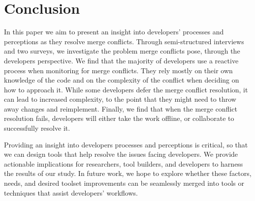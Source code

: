 \section{Conclusion}\label{conclusion}

In this paper we aim to present an insight into developers' processes and perceptions as they resolve merge conflicts.
Through semi-structured interviews and two surveys, we investigate the problem merge conflicts pose, through the developers perspective.
We find that the majority of developers use a reactive process when monitoring for merge conflicts.
They rely mostly on their own knowledge of the code and on the complexity of the conflict when deciding on how to approach it.
While some developers defer the merge conflict resolution, it can lead to increased complexity, to the point that they might need to throw away changes and reimplement.
Finally, we find that when the merge conflict resolution fails, developers will either take the work offline, or collaborate to successfully resolve it. 

Providing an insight into developers processes and perceptions is critical, so that we can design tools that help resolve the issues facing developers.
We provide actionable implications for researchers, tool builders, and developers to harness the results of our study.
In future work, we hope to explore whether these factors, needs, and desired toolset improvements can be seamlessly merged into tools or techniques that assist developers' workflows.

%
%
